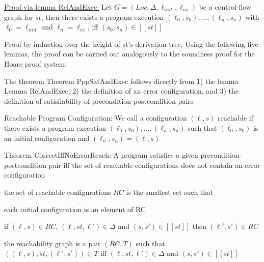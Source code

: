 \documentclass[landscape, a4paper]{article}
\begin{document}
\begin{minipage}[t]{0.2\linewidth}
\begin{betterlist}
\begin{betterlist}
			\item \underline{Proof via lemma \alert{RelAndExec}:} Let $G = (Loc, \Delta, \ell_{init}, \ell_{ex})$ be a control-flow graph for $st$, then there exists a program execution $(\ell_0, s_0), . . . , (\ell_n, s_n)$ with $\ell_0 = \ell_{init}$ and $\ell_n = \ell_{ex}$, iff $(s_0, s_n) \in [[st]]$
			\begin{betterlist}
				\item Proof by induction over the height of st’s derivation tree. Using the following five lemmas, the proof can be carried out analogously to the soundness proof for the Hoare proof system:
				\begin{betterlist}
					\item {}
					\item {}
					\item {}
					\item {}
				\end{betterlist}
			\end{betterlist}
			\item The theorem Theorem PppSatAndExec follows directly from 1) the lemma Lemma RelAndExec, 2) the definition of an error configuration, and 3) the definition of satisfiability of precondition-postcondition pairs
		\end{betterlist}
		\item \alert{Reachable Program Configuration:} We call a configuration $(\ell, s)$ \alert{reachable} if there exists a program execution $(\ell_0, s_0), . . . , (\ell_n, s_n)$ such that $(\ell_0, s_0)$ is an initial configuration and $(\ell_n, s_n) = (\ell, s)$
		\item \alert{Theorem CorrectIffNoErrorReach:} A program satisfies a given precondition-postcondition pair iff the set of reachable configurations does not contain an error configuration
		\item the \alert{set of reachable configurations $RC$} is the smallest set such that
		\begin{betterlist}
			\item each initial configuration is an element of RC
			\item if $(\ell, s) \in RC$, $(\ell, st, \ell') \in \Delta$ and $(s, s') \in [[st]]$ then $(\ell', s') \in RC$
		\end{betterlist}
  \item \color{orange}the \alert{reachability graph} is a pair $(RC, T)$ such that $((\ell, s), st, (\ell', s')) \in T$ iff $(\ell, st, \ell') \in \Delta$ and $(s, s') \in [[st]]$\color{black}

\end{betterlist}
\end{minipage}
\end{document}
